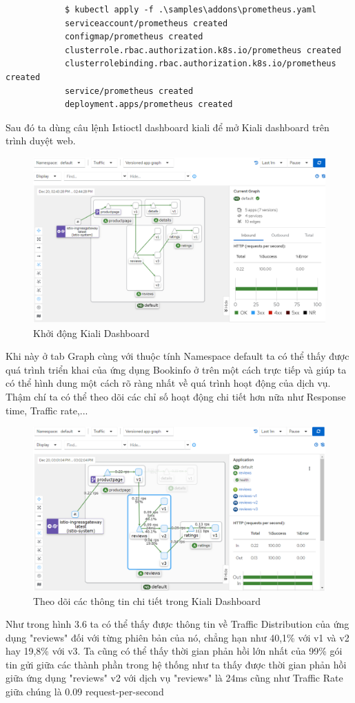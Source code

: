 \documentclass[14pt,a4paper]{book}
\begin{document}
{{\begin{lstlisting}
			$ kubectl apply -f .\samples\addons\prometheus.yaml
			serviceaccount/prometheus created
			configmap/prometheus created
			clusterrole.rbac.authorization.k8s.io/prometheus created
			clusterrolebinding.rbac.authorization.k8s.io/prometheus created
			service/prometheus created
			deployment.apps/prometheus created
		\end{lstlisting}
		Sau đó ta dùng câu lệnh {\color{red}Istioctl dashboard kiali} để mở Kiali dashboard trên trình duyệt web.
		\begin{figure}[h]
			\centering
			\includegraphics[width=0.7\linewidth]{Pics/3.3.2-1}
			\caption{Khởi động Kiali Dashboard}
			\label{fig:3}
		\end{figure}
		Khi này ở tab Graph cùng với thuộc tính Namespace default ta có thể thấy được quá trình triển khai của ứng dụng Bookinfo ở trên một cách trực tiếp và giúp ta có thể hình dung một cách rõ ràng nhất về quá trình hoạt động của dịch vụ.
		Thậm chí ta có thể theo dõi các chỉ số hoạt động chi tiết hơn nữa như Response time, Traffic rate,... 
		\begin{figure}[h]
			\centering
			\includegraphics[width=0.7\linewidth]{Pics/3.3.2-2}
			\caption{Theo dõi các thông tin chi tiết trong Kiali Dashboard}
			\label{fig:3.4-2}
		\end{figure}
		
		Như trong hình 3.6 ta có thể thấy được thông tin về Traffic Distribution của ứng dụng "reviews" đối với từng phiên bản của nó, chẳng hạn như 40,1\% với v1 và v2 hay 19,8\% với v3. Ta cũng có thể thấy thời gian phản hồi lớn nhất của 99\% gói tin gửi giữa các thành phần trong hệ thống như ta thấy được thời gian phản hồi giữa ứng dụng "reviews" v2 với dịch vụ "reviews" là 24ms cũng như Traffic Rate giữa chúng là 0.09 request-per-second 
}}
\end{document}
